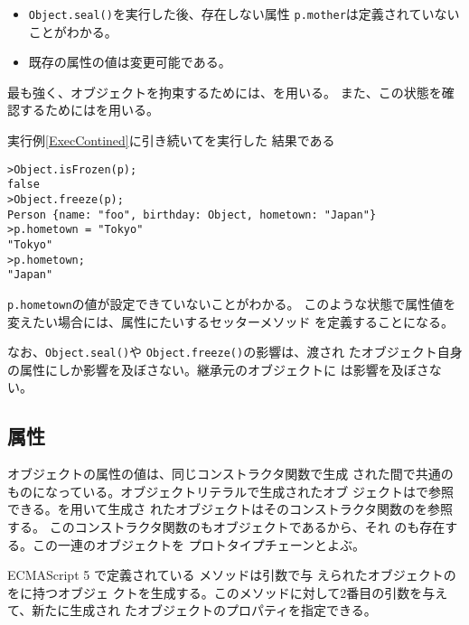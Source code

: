  \begin{itemize}
  \item \texttt{Object.seal()}を実行した後、存在しない属性
        \texttt{p.mother}は定義されていないことがわかる。
  \item 既存の属性の値は変更可能である。
 \end{itemize}
最も強く、オブジェクトを拘束するためには、を用いる。
また、この状態を確認するためにはを用いる。
  \begin{Exec}\upshape
   実行例\ref{ExecContined}に引き続いてを実行した
   結果である
 \end{Exec}
\begin{Verbatim}
>Object.isFrozen(p);
false
>Object.freeze(p);
Person {name: "foo", birthday: Object, hometown: "Japan"}
>p.hometown = "Tokyo"
"Tokyo"
>p.hometown;
"Japan"
\end{Verbatim}
 \texttt{p.hometown}の値が設定できていないことがわかる。
このような状態で属性値を変えたい場合には、属性にたいするセッターメソッド
を定義することになる。

 
 なお、\texttt{Object.seal()}や \texttt{Object.freeze()}の影響は、渡され
 たオブジェクト自身の属性にしか影響を及ぼさない。継承元のオブジェクトに
 は影響を及ぼさない。
 \subsection{\protect{}属性}
 オブジェクトの属性の値は、同じコンストラクタ関数で生成
 された間で共通のものになっている。オブジェクトリテラルで生成されたオブ
 ジェクトはで参照できる。を用いて生成さ
 れたオブジェクトはそのコンストラクタ関数のを参照する。
 このコンストラクタ関数のもオブジェクトであるから、それ
 のも存在する。この一連のオブジェクトを
 プロトタイプチェーンとよぶ。

 ECMAScript 5 で定義されている  メソッドは引数で与
 えられたオブジェクトのをに持つオブジェ
 クトを生成する。このメソッドに対して2番目の引数を与えて、新たに生成され
 たオブジェクトのプロパティを指定できる。
